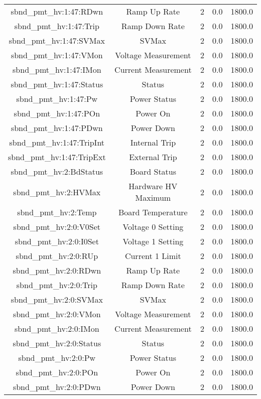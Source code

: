 \begin{center}
\begin{longtable}{c | c c c c }
sbnd\_pmt\_hv:1:47:RDwn & Ramp Up Rate & 2 & 0.0 & 1800.0\\ 
sbnd\_pmt\_hv:1:47:Trip & Ramp Down Rate & 2 & 0.0 & 1800.0\\ 
sbnd\_pmt\_hv:1:47:SVMax & SVMax & 2 & 0.0 & 1800.0\\ 
sbnd\_pmt\_hv:1:47:VMon & Voltage Measurement & 2 & 0.0 & 1800.0\\ 
sbnd\_pmt\_hv:1:47:IMon & Current Measurement & 2 & 0.0 & 1800.0\\ 
sbnd\_pmt\_hv:1:47:Status & Status & 2 & 0.0 & 1800.0\\ 
sbnd\_pmt\_hv:1:47:Pw & Power Status & 2 & 0.0 & 1800.0\\ 
sbnd\_pmt\_hv:1:47:POn & Power On & 2 & 0.0 & 1800.0\\ 
sbnd\_pmt\_hv:1:47:PDwn & Power Down & 2 & 0.0 & 1800.0\\ 
sbnd\_pmt\_hv:1:47:TripInt & Internal Trip & 2 & 0.0 & 1800.0\\ 
sbnd\_pmt\_hv:1:47:TripExt & External Trip & 2 & 0.0 & 1800.0\\ 
sbnd\_pmt\_hv:2:BdStatus & Board Status & 2 & 0.0 & 1800.0\\ 
sbnd\_pmt\_hv:2:HVMax & Hardware HV Maximum & 2 & 0.0 & 1800.0\\ 
sbnd\_pmt\_hv:2:Temp & Board Temperature & 2 & 0.0 & 1800.0\\ 
sbnd\_pmt\_hv:2:0:V0Set & Voltage 0 Setting & 2 & 0.0 & 1800.0\\ 
sbnd\_pmt\_hv:2:0:I0Set & Voltage 1 Setting & 2 & 0.0 & 1800.0\\ 
sbnd\_pmt\_hv:2:0:RUp & Current 1 Limit & 2 & 0.0 & 1800.0\\ 
sbnd\_pmt\_hv:2:0:RDwn & Ramp Up Rate & 2 & 0.0 & 1800.0\\ 
sbnd\_pmt\_hv:2:0:Trip & Ramp Down Rate & 2 & 0.0 & 1800.0\\ 
sbnd\_pmt\_hv:2:0:SVMax & SVMax & 2 & 0.0 & 1800.0\\ 
sbnd\_pmt\_hv:2:0:VMon & Voltage Measurement & 2 & 0.0 & 1800.0\\ 
sbnd\_pmt\_hv:2:0:IMon & Current Measurement & 2 & 0.0 & 1800.0\\ 
sbnd\_pmt\_hv:2:0:Status & Status & 2 & 0.0 & 1800.0\\ 
sbnd\_pmt\_hv:2:0:Pw & Power Status & 2 & 0.0 & 1800.0\\ 
sbnd\_pmt\_hv:2:0:POn & Power On & 2 & 0.0 & 1800.0\\ 
sbnd\_pmt\_hv:2:0:PDwn & Power Down & 2 & 0.0 & 1800.0\\ 

\end{longtable}
\end{center}
